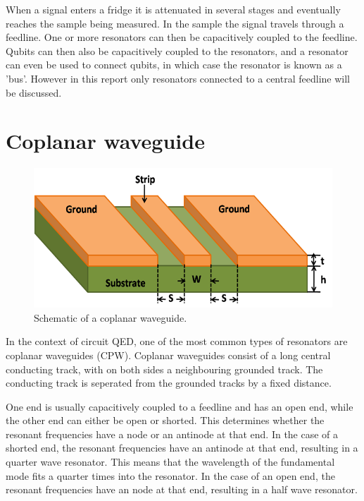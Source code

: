 \documentclass[12pt]{report}
\begin{document}
When a signal enters a fridge it is attenuated in several stages and eventually reaches the sample being measured. In the sample the signal travels through a feedline. One or more resonators can then be capacitively coupled to the feedline. Qubits can then also be capacitively coupled to the resonators, and a resonator can even be used to connect qubits, in which case the resonator is known as a 'bus'. However in this report only resonators connected to a central feedline will be discussed.









\section{Coplanar waveguide}

\begin{figure}
    \begin{center}
        \includegraphics[width=.4\textwidth]{Figures/CPW.png}
    \end{center}
    \caption{Schematic of a coplanar waveguide.}
    \label{fig:CPW}
\end{figure}

In the context of circuit QED, one of the most common types of resonators are coplanar waveguides (CPW). Coplanar waveguides consist of a long central conducting track, with on both sides a neighbouring grounded track. The conducting track is seperated from the grounded tracks by a fixed distance.

One end is usually capacitively coupled to a feedline and has an open end, while the other end can either be open or shorted. This determines whether the resonant frequencies have a node or an antinode at that end. In the case of a shorted end, the resonant frequencies have an antinode at that end, resulting in a quarter wave resonator. This means that the wavelength of the fundamental mode fits a quarter times into the resonator. In the case of an open end, the resonant frequencies have an node at that end, resulting in a half wave resonator.
\end{document}

